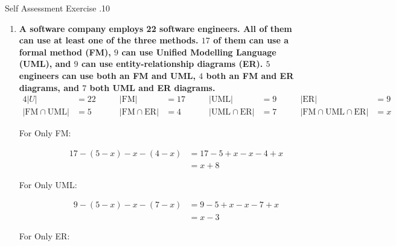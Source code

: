 \documentclass[../notes.tex]{subfiles}
\begin{document}
\begin{exercise}{Self Assessment Exercise \thechapter.10}
\begin{enumerate}
						\item \textbf{A software company employs 22 software engineers. All of them can use at least one of the three methods. $17$ of them can use a formal method (FM), $9$ can use Unified Modelling Language (UML), and $9$ can use entity-relationship diagrams (ER). $5$ engineers can use both an FM and UML, $4$ both an FM and ER diagrams, and $7$ both UML and ER diagrams.}
						\begin{alignat*}{4}
							\left\lvert U\right\rvert &= 22 \qquad & \left\lvert \mathrm{FM}\right\rvert&= 17 \qquad & \left\lvert \mathrm{UML}\right\rvert &= 9 \qquad & \left\lvert \mathrm{ER}\right\rvert &= 9 \\
							\left\lvert \mathrm{FM} \cap \mathrm{UML}\right\rvert &= 5 \qquad & \left\lvert \mathrm{FM} \cap \mathrm{ER}\right\rvert &= 4 \qquad & \left\lvert \mathrm{UML} \cap \mathrm{ER}\right\rvert &= 7 \qquad & \left\lvert \mathrm{FM} \cap \mathrm{UML} \cap \mathrm{ER}\right\rvert &= x  
						\end{alignat*}
						\begin{center}
							\begin{venndiagram3sets}[showframe=true, radius=3.5cm, overlap=2.3cm, labelA={FM}, labelB={UML}, labelC={ER}, labelABC={$x$}, labelOnlyAB={$5 - x$}, labelOnlyAC={$4 - x$}, labelOnlyBC={$7 - x$}, labelOnlyA={$x + 8$}, labelOnlyB={$x - 3$}, labelOnlyC={$x - 2$}]
								\fillBack
							\end{venndiagram3sets}
						\end{center}
						\begin{description}
							\item[For Only FM:] \rule{0pt}{11pt} \vspace*{-23pt}
								\begin{align*}
									17 - (5 - x) - x - (4 - x) &= 17 - 5 + x - x - 4 + x\\
									&= x + 8
								\end{align*}
							\item[For Only UML:] \rule{0pt}{11pt} \vspace*{-23pt}
								\begin{align*}
									9 - (5 - x) - x - (7 - x) &= 9 - 5 + x - x - 7 + x\\
									&= x - 3
								\end{align*}
							\item[For Only ER:] \rule{0pt}{11pt} \vspace*{-23pt}
								\begin{align*}

\end{align*}
\end{description}
\end{enumerate}
\end{exercise}
\end{document}
